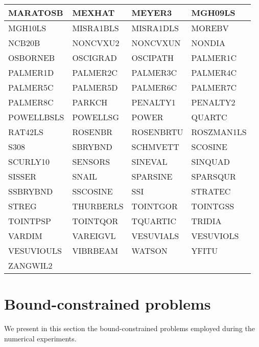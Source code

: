 \begin{longtable}{llll}
    \midrule
    MARATOSB    & MEXHAT        & MEYER3        & MGH09LS\\
    \midrule
    MGH10LS     & MISRA1BLS     & MISRA1DLS     & MOREBV\\
    \midrule
    NCB20B      & NONCVXU2      & NONCVXUN      & NONDIA\\
    \midrule
    OSBORNEB    & OSCIGRAD      & OSCIPATH      & PALMER1C\\
    \midrule
    PALMER1D    & PALMER2C      & PALMER3C      & PALMER4C\\
    \midrule
    PALMER5C    & PALMER5D      & PALMER6C      & PALMER7C\\
    \midrule
    PALMER8C    & PARKCH        & PENALTY1      & PENALTY2\\
    \midrule
    POWELLBSLS  & POWELLSG      & POWER         & QUARTC\\
    \midrule
    RAT42LS     & ROSENBR       & ROSENBRTU     & ROSZMAN1LS\\
    \midrule
    S308        & SBRYBND       & SCHMVETT      & SCOSINE\\
    \midrule
    SCURLY10    & SENSORS       & SINEVAL       & SINQUAD\\
    \midrule
    SISSER      & SNAIL         & SPARSINE      & SPARSQUR\\
    \midrule
    SSBRYBND    & SSCOSINE      & SSI           & STRATEC\\
    \midrule
    STREG       & THURBERLS     & TOINTGOR      & TOINTGSS\\
    \midrule
    TOINTPSP    & TOINTQOR      & TQUARTIC      & TRIDIA\\
    \midrule
    VARDIM      & VAREIGVL      & VESUVIALS     & VESUVIOLS\\
    \midrule
    VESUVIOULS  & VIBRBEAM      & WATSON        & YFITU\\
    \midrule
    ZANGWIL2\\
    \bottomrule
\end{longtable}

\section{Bound-constrained problems}

We present in this section the bound-constrained problems employed during the numerical experiments.

